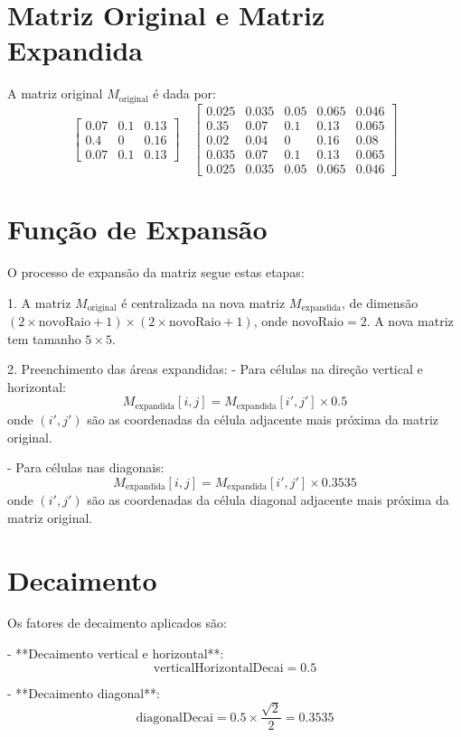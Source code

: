 \documentclass{article}
\begin{document}
\section*{Matriz Original e Matriz Expandida}

A matriz original \( M_{\text{original}} \) é dada por:
\[
\begin{bmatrix} 
0.07 & 0.1 & 0.13 \\
0.4 & 0 &  0.16\\
0.07 & 0.1 & 0.13
\end{bmatrix}
\quad
\begin{bmatrix}
0.025 & 0.035 & 0.05 & 0.065 & 0.046 \\
0.35 & 0.07 & 0.1 & 0.13 & 0.065 \\
0.02 & 0.04 & 0 & 0.16 & 0.08 \\
0.035 & 0.07 & 0.1 & 0.13 & 0.065 \\
0.025 & 0.035 & 0.05 & 0.065 & 0.046
\end{bmatrix}
\]

\section*{Função de Expansão}

O processo de expansão da matriz segue estas etapas:

1. A matriz \( M_{\text{original}} \) é centralizada na nova matriz \( M_{\text{expandida}} \), de dimensão \( (2 \times \text{novoRaio} + 1) \times (2 \times \text{novoRaio} + 1) \), onde \( \text{novoRaio} = 2 \). A nova matriz tem tamanho \( 5 \times 5 \).

2. Preenchimento das áreas expandidas:
   - Para células na direção vertical e horizontal:
   \[
   M_{\text{expandida}}[i, j] = M_{\text{expandida}}[i', j'] \times 0.5
   \]
   onde \( (i', j') \) são as coordenadas da célula adjacente mais próxima da matriz original.

   - Para células nas diagonais:
   \[
   M_{\text{expandida}}[i, j] = M_{\text{expandida}}[i', j'] \times 0.3535
   \]
   onde \( (i', j') \) são as coordenadas da célula diagonal adjacente mais próxima da matriz original.

\section*{Decaimento}

Os fatores de decaimento aplicados são:

- **Decaimento vertical e horizontal**:
  \[
  \text{verticalHorizontalDecai} = 0.5
  \]

- **Decaimento diagonal**:
  \[
  \text{diagonalDecai} = 0.5 \times \frac{\sqrt{2}}{2} = 0.3535
  \]
\end{document}
